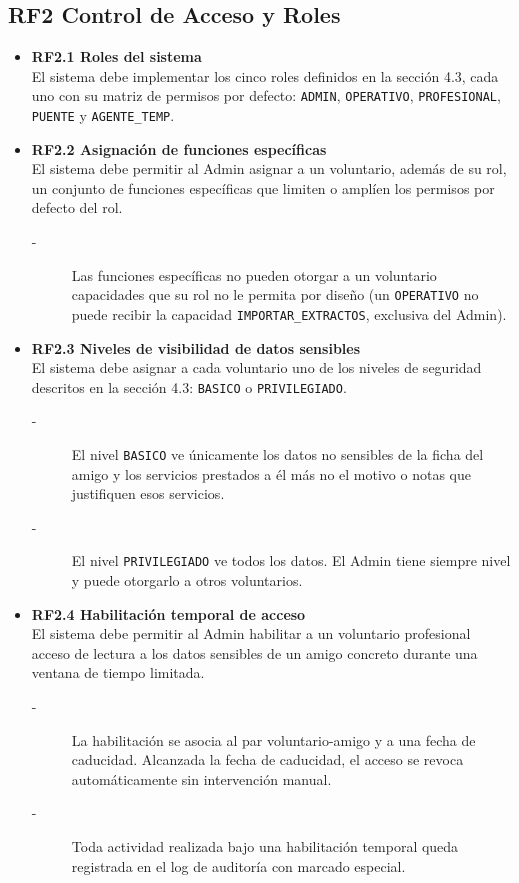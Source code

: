 \subsection{RF2 Control de Acceso y Roles}
\begin{itemize}
    \item \textbf{RF2.1 Roles del sistema} \\
    El sistema debe implementar los cinco roles definidos en la sección 4.3, cada uno
    con su matriz de permisos por defecto: \texttt{ADMIN}, \texttt{OPERATIVO},
    \texttt{PROFESIONAL}, \texttt{PUENTE} y \texttt{AGENTE\_TEMP}.

    \item \textbf{RF2.2 Asignación de funciones específicas} \\
    El sistema debe permitir al Admin asignar a un voluntario, además de su
    rol, un conjunto de funciones específicas que limiten o amplíen los
    permisos por defecto del rol.
    \begin{description}
        \item[-] Las funciones específicas no pueden otorgar a un voluntario
        capacidades que su rol no le permita por diseño (un \texttt{OPERATIVO} no
        puede recibir la capacidad \texttt{IMPORTAR\_EXTRACTOS}, exclusiva del Admin).
    \end{description}

    \item \textbf{RF2.3 Niveles de visibilidad de datos sensibles} \\
    El sistema debe asignar a cada voluntario uno de los niveles de
    seguridad descritos en la sección 4.3: \texttt{BASICO} o \texttt{PRIVILEGIADO}.
    \begin{description}
        \item[-] El nivel \texttt{BASICO} ve únicamente los datos no sensibles de la ficha del amigo y
        los servicios prestados a él más no el motivo o notas que justifiquen esos servicios.
        \item[-] El nivel \texttt{PRIVILEGIADO} ve todos los datos. El Admin tiene siempre nivel y puede otorgarlo a otros voluntarios.
    \end{description}

    \item \textbf{RF2.4 Habilitación temporal de acceso} \\
    El sistema debe permitir al Admin habilitar a un voluntario profesional
    acceso de lectura a los datos sensibles de un amigo concreto durante una
    ventana de tiempo limitada.
    \begin{description}
        \item[-] La habilitación se asocia al par voluntario-amigo y a una fecha de
        caducidad. Alcanzada la fecha de caducidad, el acceso se revoca automáticamente sin intervención manual.
        \item[-] Toda actividad realizada bajo una habilitación temporal queda
        registrada en el log de auditoría con marcado especial.
    \end{description}
    

\end{itemize}
